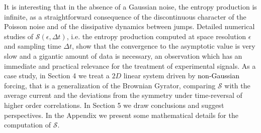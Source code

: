 \documentclass[12pt]{iopart}
\newcommand{\cS} {\mathcal{S}}
\begin{document}
It is interesting that in the absence of  a Gaussian noise,  the entropy production is infinite,
as a straightforward consequence  of the discontinuous character of the Poisson noise and of the dissipative dynamics between jumps.
Detailed numerical studies  of $\cS(\epsilon, \Delta t)$, i.e. the entropy production  computed at  space resolution $\epsilon$ and  sampling time $\Delta t$,
show that the convergence to the asymptotic value is very slow and a gigantic amount of data is necessary,  
an observation which has an immediate and practical relevance for the treatment of experimental signals.
  As a case study,  in  Section 4  we treat a $2D$ linear system driven by \textcolor{black}{non-Gaussian} forcing,
  that is a generalization of the Brownian Gyrator, comparing  $\cS$ with the average current and the
  deviations from the symmetry under time-reversal of higher order correlations. In Section 5 we draw conclusions and suggest perspectives.
In  the Appendix  we present some mathematical details for the computation of $\cS$.


\end{document}
